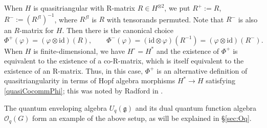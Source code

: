 \documentclass[11pt]{amsart}
\begin{document}
\indent When $H$ is quasitriangular with R-matrix $R \in H^{\otimes 2}$, we put $R^+:=R$, $R^- := (R^{fl})^{-1}$, where $R^{fl}$ is $R$ with tensorands permuted. Note that $R^-$ is also an $R$-matrix for $H$. Then there is the canonical choice
\begin{equation}\label{LfuncFromRmat}
\Phi^+(\varphi) = (\varphi \otimes \mathrm{id})(R), \qquad \Phi^-(\varphi) = (\mathrm{id} \otimes \varphi)(R^{-1})=(\varphi \otimes \mathrm{id})(R^-).
\end{equation}
\noindent When $H$ is finite-dimensional, we have $H^\circ = H^*$ and the existence of $\Phi^+$ is equivalent to the existence of a co-R-matrix, which is itself equivalent to the existence of an R-matrix. Thus, in this case, $\Phi^+$ is an alternative definition of quasitriangularity in terms of Hopf algebra morphisms $H^* \to H$ satisfying \eqref{quasiCocommPhi}; this was noted by Radford in \cite{radfordQuasitriang}.

\smallskip

\indent The quantum enveloping algebra $U_q(\mathfrak{g})$ and its dual quantum function algebra $\mathcal{O}_q(G)$ form an example of the above setup, as will be explained in \S\ref{sec:Oq}.

\smallskip
\end{document}
